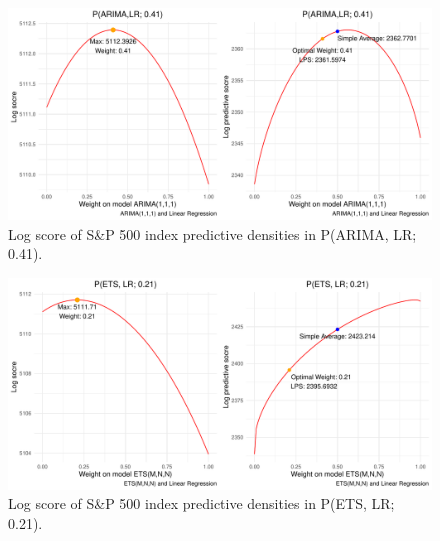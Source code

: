 \begin{frame}[plain]{}
\begin{figure}[ht]
\centering
\includegraphics[scale=0.55]{Graph/SP500_nonstat_2.pdf}
\caption{\footnotesize{Log score of S\&P 500 index predictive densities in P(ARIMA, LR; 0.41).}}
\end{figure}
\end{frame}



\begin{frame}[plain]{}
\begin{figure}[ht]
\centering
\includegraphics[scale=0.55]{Graph/SP500_nonstat_3.pdf}
\caption{\footnotesize{Log score of S\&P 500 index predictive densities in P(ETS, LR; 0.21).}}
\end{figure}
\end{frame}



